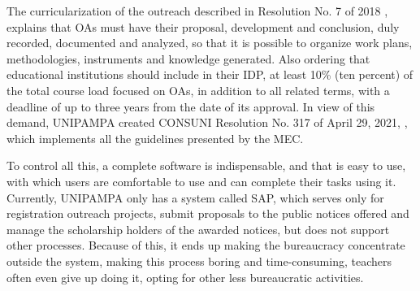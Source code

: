 The curricularization of the outreach described in Resolution No. 7 of 2018 \cite{Resolucao-MEC:2018}, explains that \acp{OA} must have their proposal, development and conclusion, duly recorded, documented and analyzed, so that it is possible to organize work plans, methodologies, instruments and knowledge generated. 
Also ordering that educational institutions should include in their \ac{IDP}, at least 10\% (ten percent) of the total course load focused on \acp{OA}, in addition to all related terms, with a deadline of up to three years from the date of its approval. 
In view of this demand, \acl{UNIPAMPA} created \ac{CONSUNI} Resolution No. 317 of April 29, 2021, \cite{CONSUNI-Unipampa:2021}, which implements all the guidelines presented by the \ac{MEC}.



To control all this, a complete software is indispensable, and that is easy to use, with which users are comfortable to use and can complete their tasks using it. 
Currently, \acl{UNIPAMPA} only has a system called \ac{SAP}, which serves only for registration outreach projects, submit proposals to the public notices offered and manage the scholarship holders of the awarded notices, but does not support other processes. 
Because of this, it ends up making the bureaucracy concentrate outside the system, making this process boring and time-consuming, teachers often even give up doing it, opting for other less bureaucratic activities.



